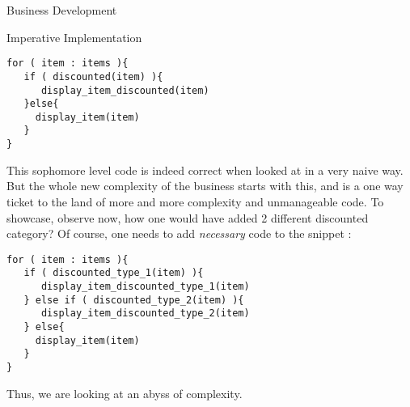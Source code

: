 \begin{section}{Business Development}
\begin{subsection}{Imperative Implementation}
\begin{lstlisting}[style=JexlStyle]
for ( item : items ){
   if ( discounted(item) ){
      display_item_discounted(item)
   }else{
     display_item(item)
   }
}
\end{lstlisting}

This sophomore level code is indeed correct when looked at in a very naive way.
But the whole new complexity of the business starts with this, and is a one way ticket to the land of more and more complexity and unmanageable code. To showcase, observe now, how one would have added 2 different discounted category? Of course, one needs to add \emph{necessary} code to the snippet :

\begin{lstlisting}[style=JexlStyle]
for ( item : items ){
   if ( discounted_type_1(item) ){
      display_item_discounted_type_1(item)
   } else if ( discounted_type_2(item) ){
      display_item_discounted_type_2(item)
   } else{
     display_item(item)
   }
}
\end{lstlisting}

Thus, we are looking at an abyss of complexity. 
\end{subsection}

\end{section}

